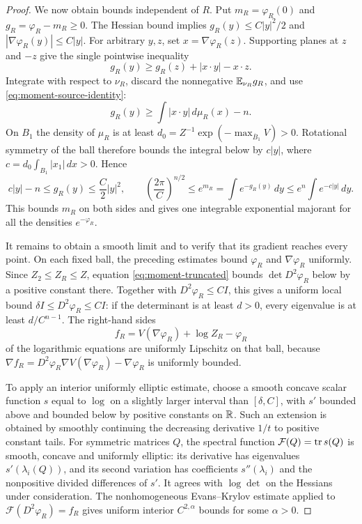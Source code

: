 \begin{proof}
We now obtain bounds independent of $R$.  Put
$m_R=\varphi_R(0)$ and $g_R=\varphi_R-m_R\ge0$.
The Hessian bound implies
$g_R(y)\le C|y|^2/2$ and $|\nabla\varphi_R(y)|\le C|y|$.
For arbitrary $y,z$, set $x=\nabla\varphi_R(z)$.  Supporting planes
at $z$ and $-z$ give the single pointwise inequality
\[
 g_R(y)\ge g_R(z)+|x\cdot y|-x\cdot z.
\]
Integrate with respect to $\nu_R$, discard the nonnegative
$\mathbb E_{\nu_R}g_R$, and use \eqref{eq:moment-source-identity}:
\[
 g_R(y)\ge\int|x\cdot y|\,d\mu_R(x)-n.
\]
On $B_1$ the density of $\mu_R$ is at least
$d_0=Z^{-1}\exp(-\max_{\overline B_1}V)>0$.
Rotational symmetry of the ball therefore bounds the integral below
by $c|y|$, where $c=d_0\int_{B_1}|x_1|\,dx>0$.  Hence
\begin{equation}\label{eq:moment-coercivity}
 c|y|-n\le g_R(y)\le\frac C2|y|^2,
 \qquad
 \left(\frac{2\pi}{C}\right)^{n/2}
 \le e^{m_R}=\int e^{-g_R(y)}\,dy
 \le e^n\int e^{-c|y|}\,dy.
\end{equation}
This bounds $m_R$ on both sides and gives one integrable exponential
majorant for all the densities $e^{-\varphi_R}$.

It remains to obtain a smooth limit and to verify that its gradient
reaches every point.  On each fixed ball, the preceding estimates
bound $\varphi_R$ and $\nabla\varphi_R$ uniformly.  Since
$Z_2\le Z_R\le Z$, equation \eqref{eq:moment-truncated} bounds
$\det D^2\varphi_R$ below by a positive constant there.
Together with $D^2\varphi_R\le CI$, this gives a uniform local bound
$\delta I\le D^2\varphi_R\le CI$: if the determinant is at least
$d>0$, every eigenvalue is at least $d/C^{n-1}$.
The right-hand sides
\[
 f_R=V(\nabla\varphi_R)+\log Z_R-\varphi_R
\]
of the logarithmic equations are uniformly Lipschitz on that ball,
because
$\nabla f_R=D^2\varphi_R\nabla V(\nabla\varphi_R)
-\nabla\varphi_R$ is uniformly bounded.

To apply an interior uniformly elliptic estimate, choose a smooth
concave scalar function $s$ equal to $\log$ on a slightly larger
interval than $[\delta,C]$, with $s'$ bounded above and bounded below
by positive constants on $\mathbb R$.  Such an extension is obtained by
smoothly continuing the decreasing derivative $1/t$ to positive
constant tails.  For symmetric matrices $Q$, the spectral function
$\mathcal F(Q)=\operatorname{tr} s(Q)$ is smooth, concave and uniformly elliptic:
its derivative has eigenvalues $s'(\lambda_i(Q))$, and its second
variation has coefficients $s''(\lambda_i)$ and the nonpositive
divided differences of $s'$.  It agrees with $\log\det$ on the
Hessians under consideration.  The nonhomogeneous Evans--Krylov
estimate \cite[Corollary~2.3]{Wang2012} applied to
$\mathcal F(D^2\varphi_R)=f_R$ gives uniform interior
$C^{2,\alpha}$ bounds for some $\alpha>0$.


\end{proof}
